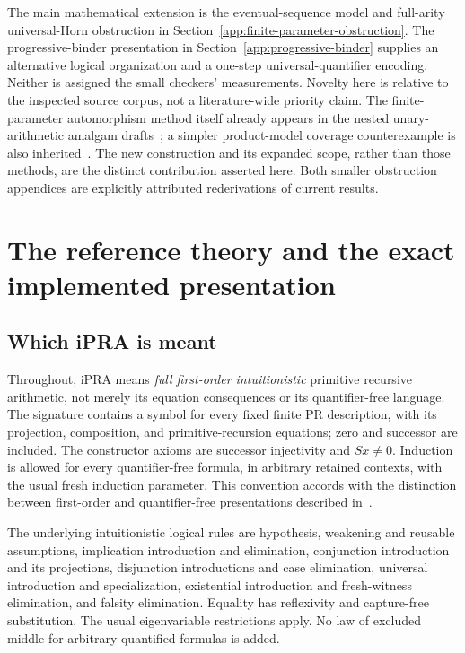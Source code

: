 \documentclass[11pt,letterpaper]{article}
\theoremstyle{definition}\newtheorem{definition}[theorem]{Definition}
\theoremstyle{remark}\newtheorem{remark}[theorem]{Remark}
\begin{document}
The main mathematical extension is the eventual-sequence model
and full-arity universal-Horn obstruction in
Section~\ref{app:finite-parameter-obstruction}. The progressive-binder
presentation in Section~\ref{app:progressive-binder} supplies an alternative
logical organization and a one-step universal-quantifier encoding.
Neither is assigned the small checkers' measurements. Novelty here is
relative to the inspected source corpus, not a literature-wide priority claim.
The finite-parameter automorphism method itself already appears in the
nested unary-arithmetic amalgam drafts~\cite{prioramalgam}; a simpler
product-model coverage counterexample is also inherited~\cite{priorproduct}.
The new construction and its expanded scope, rather than those methods,
are the distinct contribution asserted here. Both smaller obstruction
appendices are explicitly attributed rederivations of current results.

\section{The reference theory and the exact implemented presentation}
\label{sec:implemented-theory}

\subsection{Which iPRA is meant}

Throughout, iPRA means \emph{full first-order intuitionistic} primitive
recursive arithmetic, not merely its equation consequences or its
quantifier-free language. The signature contains a symbol for every
fixed finite PR description, with its projection, composition, and
primitive-recursion equations; zero and successor are included. The
constructor axioms are successor injectivity and $Sx\ne0$. Induction
is allowed for every quantifier-free formula, in arbitrary retained
contexts, with the usual fresh induction parameter.
This convention accords with the distinction between first-order and
quantifier-free presentations described in~\cite{avigad}.

The underlying intuitionistic logical rules are hypothesis, weakening
and reusable assumptions, implication introduction and elimination,
conjunction introduction and its projections, disjunction introductions
and case elimination, universal introduction and specialization,
existential introduction and fresh-witness elimination, and falsity
elimination. Equality has reflexivity and capture-free substitution.
The usual eigenvariable restrictions apply. No law of excluded middle
for arbitrary quantified formulas is added.
\end{document}
